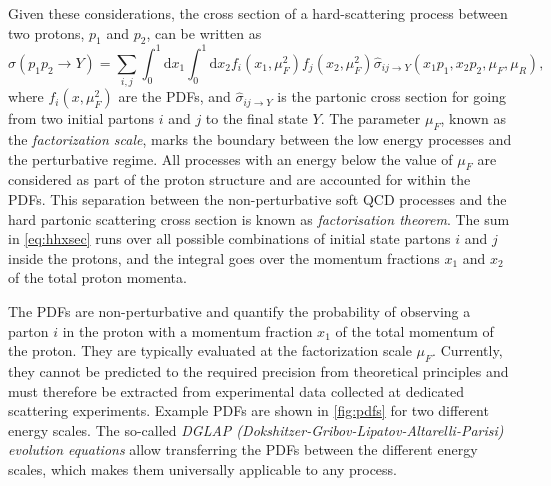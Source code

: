 Given these considerations, the cross section of a hard-scattering process between two protons, $p_1$ and $p_2$, can be written as
\begin{equation}
  \sigma(p_1p_2 \to Y) = \sum_{i,j} \int_0^1 \mathrm{d}x_1 \int_0^1 \mathrm{d}x_2 f_i(x_1,\mu_F^2) f_j(x_2,\mu_F^2) \hat{\sigma}_{ij \rightarrow Y}(x_1p_1,x_2p_2,\mu_F,\mu_R), 
  \label{eq:hhxsec}
\end{equation}
where $f_i(x,\mu_F^2)$ are the PDFs, and $\hat{\sigma}_{ij \rightarrow Y}$ is the partonic cross section for going from two initial partons $i$ and $j$ to the final state $Y$.
The parameter $\mu_F$, known as the \emph{factorization scale}, marks the boundary between the low energy processes and the perturbative regime. 
All processes with an energy below the value of $\mu_F$ are considered as part of the proton structure and are accounted for within the PDFs. 
This separation between the non-perturbative soft QCD processes and the hard partonic scattering cross section is known as \emph{factorisation theorem}.
The sum in \cref{eq:hhxsec} runs over all possible combinations of initial state partons $i$ and $j$ inside the protons, and the integral goes over the momentum fractions $x_1$ and $x_2$ of the total proton momenta.

The PDFs are non-perturbative and quantify the probability of observing a parton $i$ in the proton with a momentum fraction $x_1$ of the total momentum of the proton.
They are typically evaluated at the factorization scale $\mu_F$. 
Currently, they cannot be predicted to the required precision from theoretical principles and must therefore be extracted from experimental data collected at dedicated scattering experiments.
Example PDFs are shown in \cref{fig:pdfs} for two different energy scales.
The so-called \emph{DGLAP (Dokshitzer-Gribov-Lipatov-Altarelli-Parisi) evolution equations} \cite{Dokshitzer:1977sg,GRIBOV197178,Altarelli:1977zs} allow transferring the PDFs between the different energy scales, which makes them universally applicable to any process. 

